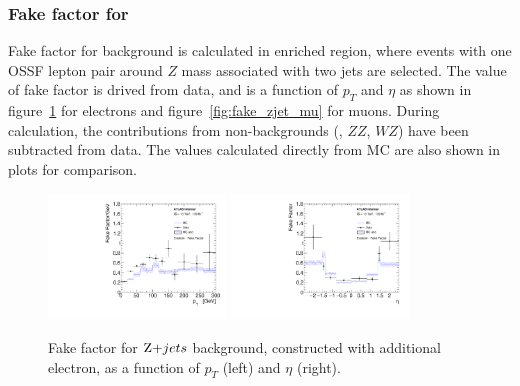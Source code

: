 \subsubsection{Fake factor for \Zjet}

Fake factor for \Zjet background is calculated in \Zjet enriched region, where events with one OSSF lepton pair around $Z$ mass associated with two jets are selected.
The value of fake factor is drived from data, and is a function of $p_{T}$ and $\eta$ as shown in figure~\ref{fig:fake_zjet_el} for electrons and figure~\ref{fig:fake_zjet_mu} for muons.
During calculation, the contributions from non-\Zjet backgrounds (\ttbar, $ZZ$, $WZ$) have been subtracted from data.
The values calculated directly from \Zjet MC are also shown in plots for comparison.
\begin{figure}[!htb]
  \centering
  \includegraphics[width=0.42\textwidth]{figures/VBSZZ/fakebkg/Electron_2Dff_ptfakeFactorAddElectron_etapt_pavgy.pdf}
  \includegraphics[width=0.42\textwidth]{figures/VBSZZ/fakebkg/Electron_2Dff_etafakeFactorAddElectron_etapt_pavgx.pdf}
  \caption{Fake factor for $\Zjet$ background, constructed with additional electron, as a function of $p_{T}$ (left) and $\eta$ (right).}
  \label{fig:fake_zjet_el}
\end{figure}

